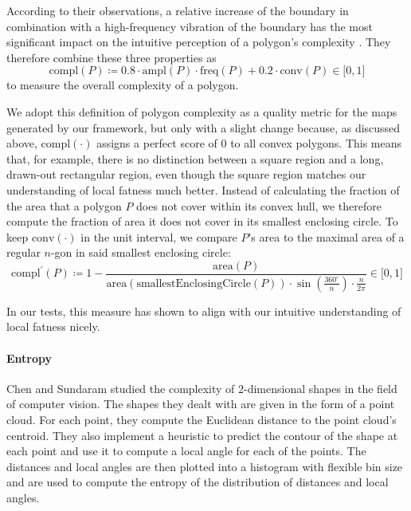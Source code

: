 According to their observations, a relative increase of the boundary in combination with a high-frequency vibration of the boundary has the most significant impact on the intuitive perception of a polygon's complexity \cite{brinkhoff1995measuring}.
They therefore combine these three properties as
%
\begin{equation}
\text{compl}(P) \coloneqq
0.8 \cdot \text{ampl}(P) \cdot \text{freq}(P) + 0.2 \cdot \text{conv}(P)
\in \lbrack0,1\rbrack
\end{equation}
%
to measure the overall complexity of a polygon.

We adopt this definition of polygon complexity as a quality metric for the maps generated by our framework, but only with a slight change because, as discussed above, $\text{compl}(\cdot)$ assigns a perfect score of $0$ to all convex polygons.
This means that, for example, there is no distinction between a square region and a long, drawn-out rectangular region, even though the square region matches our understanding of local fatness much better.
Instead of calculating the fraction of the area that a polygon $P$ does not cover within its convex hull, we therefore compute the fraction of area it does not cover in its smallest enclosing circle.
To keep $\text{conv}(\cdot)$ in the unit interval, we compare $P$'s area to the maximal area of a regular $n$-gon in said smallest enclosing circle:
%
\begin{equation*}
\text{compl}^\prime(P) \coloneqq
1 - \frac{\text{area}(P)}{\text{area}(\text{smallestEnclosingCircle}(P)) \cdot \sin\left(\frac{360^\circ}{n}\right) \cdot \frac{n}{2\pi}}
\in \lbrack0,1\rbrack
\end{equation*}

In our tests, this measure has shown to align with our intuitive understanding of local fatness nicely.



\paragraph{Entropy}

Chen and Sundaram \cite{chen2005estimating} studied the complexity of 2-dimensional shapes in the field of computer vision.
The shapes they dealt with are given in the form of a point cloud.
For each point, they compute the Euclidean distance to the point cloud's centroid.
They also implement a heuristic to predict the contour of the shape at each point and use it to compute a local angle for each of the points.
The distances and local angles are then plotted into a histogram with flexible bin size and are used to compute the entropy of the distribution of distances and local angles.

